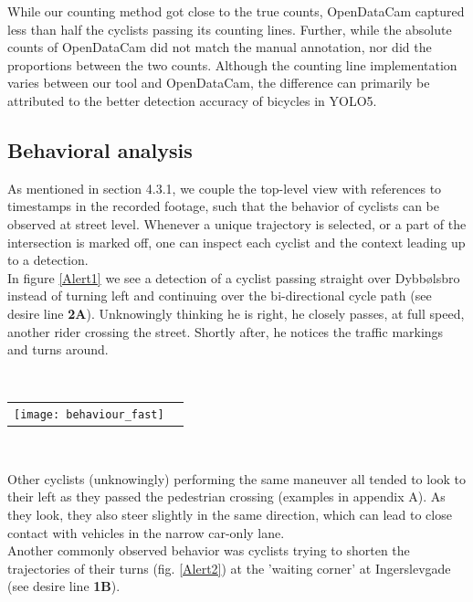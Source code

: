 While our counting method got close to the true counts, OpenDataCam captured less than half the cyclists passing its 
counting lines. Further, while the absolute counts of OpenDataCam did not match the manual annotation, 
nor did the proportions between the two counts.
Although the counting line implementation varies between our tool and OpenDataCam, 
the difference can primarily be attributed to the better detection accuracy of bicycles in YOLO5.
\ \\

\subsection{Behavioral analysis}
As mentioned in section 4.3.1, we couple the top-level view with references to timestamps in the recorded footage, 
such that the behavior of cyclists can be observed at street level.
Whenever a unique trajectory is selected, or a part of the intersection is marked off, one can inspect each cyclist 
and the context leading up to a detection.
\\

In figure \ref{Alert1} we see a detection of a cyclist passing straight over Dybbølsbro instead of turning left and 
continuing over the bi-directional cycle path (see desire line \textbf{2A}). Unknowingly thinking he is right, he closely passes, at full speed, another rider crossing
the street. Shortly after, he notices the traffic markings and turns around. 

\ \\ 
\raggedbottom
\begin{tabular}{@{}cc}
\texttt{[image: behaviour\_fast]} 
\end{tabular}
\label{Alert1}
\

Other cyclists (unknowingly) performing the same maneuver all tended to look to their left 
as they passed the pedestrian crossing (examples in appendix A).
As they look, they also steer slightly in the same direction, which can lead to close contact with vehicles
in the narrow car-only lane. 
\ \\

Another commonly observed behavior was cyclists trying to shorten the trajectories of their turns (fig. \ref{Alert2})
at the 'waiting corner' at Ingerslevgade (see desire line \textbf{1B}).


